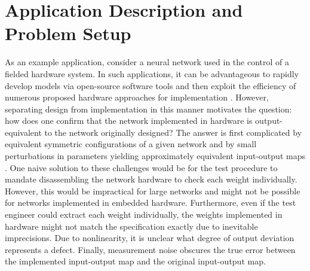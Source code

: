 \section{Application Description and Problem Setup}
\label{sec_application_description}
As an example application, consider a neural network
used in the control of a fielded hardware system. In such
applications, it can be advantageous to rapidly develop
models via open-source software tools
\cite{scikit-learn,pytorch,tensorflow}
and then exploit the efficiency of numerous proposed
hardware approaches for implementation
\cite{misra_artificial_2010,maliuk_experimentation_2015,abdelsalam_accurate_2016,schuman_survey_2017}.
However, separating design from implementation in this manner
motivates the question: how does one confirm that the
network implemented in hardware is output-equivalent
to the network originally designed?
The answer is first complicated by equivalent
symmetric configurations of a given network
\cite{sussmann_uniqueness_1992,albertini_uniqueness_1993}
and by small perturbations in parameters
yielding approximately equivalent input-output maps
\cite{dimattina_how_2010}.
One naive solution to these challenges would be
for the test procedure to mandate disassembling the network
hardware to check each weight individually.  However, this
would be impractical for large networks and might not be
possible for networks implemented in embedded hardware.
Furthermore, even if the test engineer could extract each
weight individually, the weights implemented in hardware
might not match the specification exactly due to inevitable imprecisions.
Due to nonlinearity, it is unclear what degree of output deviation
represents a defect.  Finally, measurement noise obscures the true error
between the implemented input-output map and the original
input-output map.

